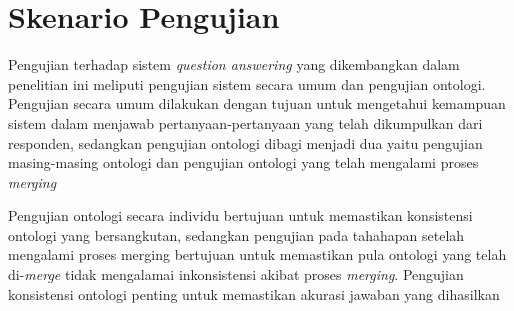 \section{Skenario Pengujian}
Pengujian terhadap sistem \emph{question answering} yang dikembangkan dalam penelitian ini meliputi pengujian sistem secara umum dan pengujian ontologi. Pengujian secara umum dilakukan dengan tujuan untuk mengetahui kemampuan sistem dalam menjawab pertanyaan-pertanyaan yang telah dikumpulkan dari responden, sedangkan pengujian ontologi dibagi menjadi dua yaitu pengujian masing-masing ontologi dan pengujian ontologi yang telah mengalami proses \emph{merging}

Pengujian ontologi secara individu bertujuan untuk memastikan konsistensi ontologi yang bersangkutan, sedangkan pengujian pada tahahapan setelah mengalami proses merging bertujuan untuk memastikan pula ontologi yang telah di-\emph{merge} tidak mengalamai inkonsistensi akibat proses \emph{merging}. Pengujian konsistensi ontologi penting untuk memastikan akurasi jawaban yang dihasilkan 